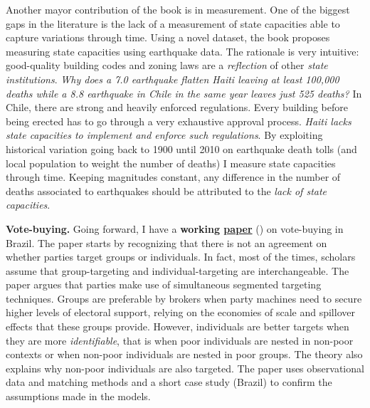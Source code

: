 \documentclass[11pt]{letter} %
\begin{document}
\begin{letter}{}
Another mayor contribution of the book is in measurement. One of the biggest gaps in the literature is the lack of a measurement of state capacities able to capture variations through time. Using a novel dataset, the book proposes measuring state capacities using earthquake data. The rationale is very intuitive: good-quality building codes and zoning laws are a \emph{reflection} of other \emph{state institutions}. \emph{Why does a 7.0 earthquake flatten Haiti leaving at least 100,000 deaths while a 8.8 earthquake in Chile in the same year leaves just 525 deaths?} In Chile, there are strong and heavily enforced regulations. Every building before being erected has to go through a very exhaustive approval process. \emph{Haiti lacks state capacities to implement and enforce such regulations}. By exploiting historical variation going back to 1900 until 2010 on earthquake death tolls (and local population to weight the number of deaths) I measure state capacities through time. Keeping magnitudes constant, any difference in the number of deaths associated to earthquakes should be attributed to the \emph{lack of state capacities}. 

{\bf Vote-buying.} Going forward, I have a {\bf working \href{https://github.com/hbahamonde/Clientelism_paper/raw/master/Bahamonde_Clientelism_Paper.pdf}{paper}} (\emph{\unskip}) on vote-buying in Brazil. The paper starts by recognizing that there is not an agreement on whether parties target groups or individuals. In fact, most of the times, scholars assume that group-targeting and individual-targeting are interchangeable. The paper argues that parties make use of simultaneous segmented targeting techniques. Groups are preferable by brokers when party machines need to secure higher levels of electoral support, relying on the economies of scale and spillover effects that these groups provide. However, individuals are better targets when they are more \emph{identifiable}, that is when poor individuals are nested in non-poor contexts or when non-poor individuals are nested in poor groups. The theory also explains why non-poor individuals are also targeted. The paper uses observational data and matching methods and a short case study (Brazil) to confirm the assumptions made in the models.


\end{letter}
\end{document}
